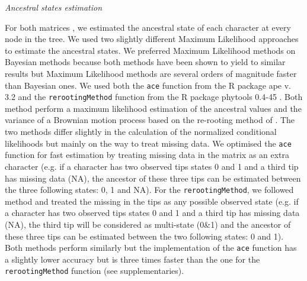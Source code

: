 \documentclass[12pt,letterpaper]{article}
\renewcommand{\subsection}[1]{%
\bigskip
\begin{center}
\begin{large}
\normalfont\itshape #1
\end{large}
\end{center}}
\begin{document}
\subsection{Ancestral states estimation}
For both matrices \cite{MEE3:MEE312084,beckancient2014}, we estimated the ancestral state of each character at every node in the tree. We used two slightly different Maximum Likelihood approaches to estimate the ancestral states. We preferred Maximum Likelihood methods on Bayesian methods because both methods have been shown to yield to similar results \cite{royer-carenzichoosing2013} but Maximum Likelihood methods are several orders of magnitude faster than Bayesian ones. We used both the \texttt{ace} function from the R package ape v. 3.2 \cite{paradisape:2004} and the 
\texttt{rerootingMethod} function from the R package phytools 0.4-45 \cite{phytools}. Both method perform a maximum likelihood estimation of the ancestral values and the variance of a Brownian motion process based on the re-rooting method of \cite{Yang01121995}. The two methods differ slightly in the calculation of the normalized conditional likelihoods but mainly on the way to treat missing data. We optimised the \texttt{ace} function for fast estimation by treating missing data in the matrix as an extra character (e.g. if a character has two observed tips states 0 and 1 and a third tip has missing data (NA), the ancestor of these three tips can be estimated between the three following states: 0, 1 and NA). For the \texttt{rerootingMethod}, we followed \cite{Claddis} method and treated the missing in the tips as any possible observed state (e.g. if a character has two observed tips states 0 and 1 and a third tip has missing data (NA), the third tip will be considered as multi-state (0\&1) and the ancestor of these three tips can be estimated between the two following states: 0 and 1). Both methods perform similarly but the implementation of the \texttt{ace} function has a slightly lower accuracy  but is three times faster than the one for the \texttt{rerootingMethod} function (see supplementaries).
\end{document}
